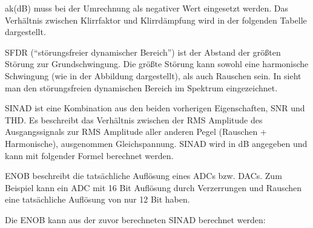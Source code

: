 

ak(dB) muss bei der Umrechnung als negativer Wert eingesetzt werden. Das Verhältnis zwischen Klirrfaktor und Klirrdämpfung wird in der folgenden Tabelle dargestellt.


SFDR (\enquote{störungsfreier dynamischer Bereich}) ist der Abstand der größten Störung zur Grundschwingung. Die größte Störung kann sowohl eine harmonische Schwingung (wie in der Abbildung dargestellt), als auch Rauschen sein. In  sieht man den störungsfreien dynamischen Bereich im Spektrum eingezeichnet.


SINAD ist eine Kombination aus den beiden vorherigen Eigenschaften, SNR und THD. Es beschreibt das Verhältnis zwischen der RMS Amplitude des Ausgangssignals zur RMS Amplitude aller anderen Pegel (Rauschen + Harmonische), ausgenommen Gleichspannung. SINAD wird in dB angegeben und kann mit folgender Formel berechnet werden.


ENOB beschreibt die tatsächliche Auflösung eines \gls{ADC}s bzw. \gls{DAC}s. Zum Beispiel kann ein \gls{ADC} mit 16 Bit Auflösung durch Verzerrungen und Rauschen eine tatsächliche Auflösung von nur 12 Bit haben.

Die ENOB kann aus der zuvor berechneten SINAD berechnet werden: 


